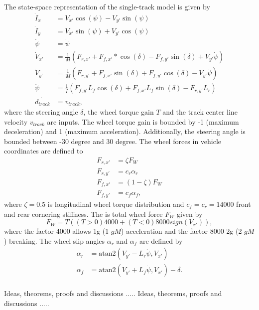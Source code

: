 \documentclass[letterpaper, 10 pt, conference]{ieeeconf}  %
\begin{document}
The state-space representation of the single-track model is given by
\begin{align}
\dot{I}_x &= V_{x'} \cos(\psi) - V_{y'} \sin(\psi)\\
\dot{I}_y &= V_{x'} \sin(\psi) + V_{y'} \cos(\psi)\\
\dot{\psi} &= \dot{\psi}\\
\dot{V}_{x'} &=  \frac{1}{M}  (F_{r,x'} + F_{f,x'}*\cos(\delta) - F_{f,y'} \sin(\delta) + V_{y'}\dot{\psi})\\
\dot{V}_{y'} &=  \frac{1}{M}   (F_{r,y'} + F_{f,x'} \sin(\delta) + F_{f,y'} \cos(\delta) - V_{y'} \dot{\psi})\\
\ddot{\psi} &= \frac{1}{I} (F_{f,y'} L_f \cos(\delta) + F_{f,x'} L_f \sin(\delta) - F_{r,y'} L_r)\\
\dot{d_{track}} &= v_{track},
\end{align}
where the steering angle $\delta$, the wheel torque gain $T$ and the track center line velocity $v_{track}$ are inputs. The wheel torque gain is bounded by -1 (maximum deceleration) and 1 (maximum acceleration). Additionally, the steering angle is bounded between -30 degree and 30 degree.
The wheel forces in vehicle coordinates are defined to
\begin{align}
 F_{r,x'} &= \zeta  F_W\\
 F_{r,y'} &= c_r \alpha_r \\
 F_{f,x'} &= (1-\zeta)  F_W\\
 F_{f,y'} &= c_f  \alpha_f, 
\end{align}
where $\zeta=0.5$ is longitudinal wheel torque distribution and $c_f =c_r=14000$ front  and rear cornering stiffness. The is total wheel force $F_W$ given by
\begin{equation}
F_W = T  ( (T>0) 4000+(T<0) 8000 sign(V_{x'}) ),
\end{equation}
where the factor 4000 allows 1g (1 $g M$) acceleration and the factor 8000 2g (2 $g M$) breaking.
The wheel slip angles $\alpha_r$ and $\alpha_f$ are defined by
\begin{align}
\alpha_r &= \text{atan2}(V_{y'}-L_r \dot{\psi},V_{x'})\\
\alpha_f &= \text{atan2}(V_{y'}+L_f \dot{\psi},V_{x'}) - \delta.
\end{align}
 \\
Ideas, theorems, proofs and discussions .....
Ideas, theorems, proofs and discussions .....



\end{document}
